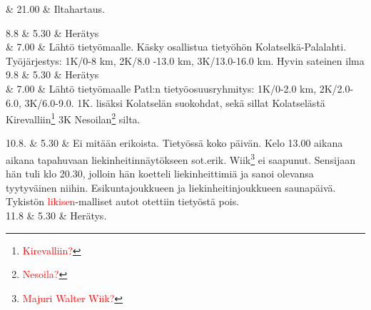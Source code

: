 \documentclass[11pt,a5paper,oneside]{book}
\begin{document}
& 21.00 & Iltahartaus. \\

\taulustop


8.8 & 5.30 & Herätys \\

& 7.00 & Lähtö tietyömaalle. \newline Käsky osallistua tietyöhön Kolatselkä-Palalahti. \newline Työjärjestys: 1K/0-8 km, 2K/8.0 -13.0 km, 3K/13.0-16.0 km. \newline Hyvin sateinen ilma \newline\newline\newline\newline\newline\newline \\

9.8 & 5.30 & Herätys \\

& 7.00 & Lähtö tietyömaalle \newline Patl:n tietyöosuusryhmitys: \newline 1K/0-2.0 km, 2K/2.0-6.0, 3K/6.0-9.0. 1K. lisäksi Kolatselän suokohdat, sekä sillat Kolatselästä Kirevalliin\footnote{\textcolor{red}{Kirevalliin?}} 3K Nesoilan\footnote{\textcolor{red}{Nesoila?}} silta. \\
\newpage

10.8. & 5.30 & Ei mitään erikoista. Tietyössä koko päivän. \newline Kelo 13.00 aikana aikana tapahuvaan liekinheitinnäytökseen sot.erik. \newline Wiik\footnote{\textcolor{red}{Majuri Walter Wiik?}} ei saapunut. \newline Sensijaan hän tuli klo 20.30, jolloin hän koetteli liekinheittimiä ja sanoi olevansa tyytyväinen niihin. \newline Esikuntajoukkueen ja liekinheitinjoukkueen saunapäivä. \newline Tykistön \textcolor{red}{likisen}-malliset autot otettiin tietyöstä pois. \newline\newline\newline\newline \\

11.8 & 5.30 & Herätys. \\
\end{document}
